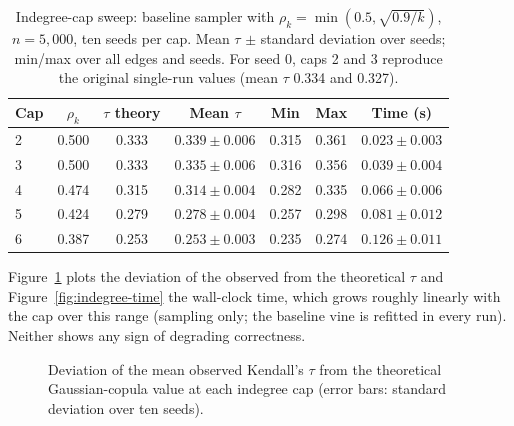 \documentclass[
  english,
  class=report,
  accentcolor=2c,
  marginpar=false,
  parskip=half-,
  fontsize=11pt,
  ruledheaders=false,
  pdfa=false,
  IMRAD=false,
  thesis={type=master}
]{tudapub}
\begin{document}
\begin{table}[ht]
\caption{Indegree-cap sweep: baseline sampler with $\rho_k = \min(0.5, \sqrt{0.9/k})$, $n = 5{,}000$, ten seeds per cap. Mean $\tau$ $\pm$ standard deviation over seeds; min/max over all edges and seeds. For seed 0, caps 2 and 3 reproduce the original single-run values (mean $\tau$ 0.334 and 0.327).}
\label{tab:indegree}
\centering
\begin{tabular}{lcccccc}
\toprule
\textbf{Cap} & \textbf{$\rho_k$} & \textbf{$\tau$ theory} & \textbf{Mean $\tau$} & \textbf{Min} & \textbf{Max} & \textbf{Time (s)} \\
\midrule
2 & 0.500 & 0.333 & $0.339 \pm 0.006$ & 0.315 & 0.361 & $0.023 \pm 0.003$ \\
3 & 0.500 & 0.333 & $0.335 \pm 0.006$ & 0.316 & 0.356 & $0.039 \pm 0.004$ \\
4 & 0.474 & 0.315 & $0.314 \pm 0.004$ & 0.282 & 0.335 & $0.066 \pm 0.006$ \\
5 & 0.424 & 0.279 & $0.278 \pm 0.004$ & 0.257 & 0.298 & $0.081 \pm 0.012$ \\
6 & 0.387 & 0.253 & $0.253 \pm 0.003$ & 0.235 & 0.274 & $0.126 \pm 0.011$ \\
\bottomrule
\end{tabular}
\end{table}

Figure~\ref{fig:indegree-tau} plots the deviation of the observed from the
theoretical $\tau$ and Figure~\ref{fig:indegree-time} the wall-clock time,
which grows roughly linearly with the cap over this range (sampling only;
the baseline vine is refitted in every run). Neither shows any sign of
degrading correctness.

\begin{figure}[ht]
\centering
{}
\caption{Deviation of the mean observed Kendall's $\tau$ from the theoretical Gaussian-copula value at each indegree cap (error bars: standard deviation over ten seeds).}
\label{fig:indegree-tau}
\end{figure}
\end{document}
